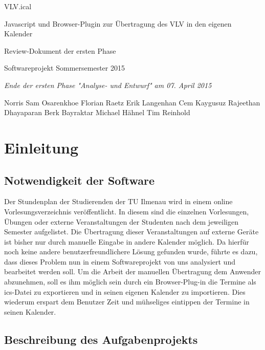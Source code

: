 \documentclass[11pt]{report}
\begin{document}
\begin{center}
\Huge
VLV.ical

\medskip
\large
Javascript und Browser-Plugin zur \"Ubertragung des VLV in den eigenen Kalender

\vskip 1in
\Large
Review-Dokument der ersten Phase

\large
\vskip 1in
Softwareprojekt Sommersemester 2015

\medskip
\textit{
Ende der ersten Phase "Analyse- und Entwurf" am 07. April 2015
}
\vskip 2in

\normalsize
\textup{ 
Norris Sam Osarenkhoe \qquad
Florian Raetz \qquad
}
\textup{ 
Erik Langenhan \qquad
Cem Kaygusuz \qquad
}
\textup{ 
Rajeethan Dhayaparan \qquad
Berk Bayraktar \qquad
}
\textup{ 
Michael H\"ahnel \qquad
Tim Reinhold
}
\end{center}

\newpage
\tableofcontents

\newpage
\chapter{Einleitung}
\section{Notwendigkeit der Software}

\normalsize \normalfont \textnormal
Der Stundenplan der Studierenden der TU Ilmenau wird in einem online Vorlesungsverzeichnis veröffentlicht. In diesem sind die einzelnen Vorlesungen, Übungen oder externe Veranstaltungen der Studenten nach dem jeweiligen Semester aufgelistet. Die Übertragung dieser Veranstaltungen auf externe Geräte ist bisher nur durch manuelle Eingabe in andere Kalender möglich. Da hierfür noch keine andere benutzerfreundlichere Lösung gefunden wurde, führte es dazu, dass dieses Problem nun in einem Softwareprojekt von uns analysiert und bearbeitet werden soll.  
Um die Arbeit der manuellen Übertragung dem Anwender abzunehmen, soll es ihm möglich sein durch ein Browser-Plug-in die Termine als ics-Datei zu exportieren und in seinen eigenen Kalender zu importieren. Dies wiederum erspart dem Benutzer Zeit und mühseliges eintippen der Termine in seinen Kalender.

\section{Beschreibung des Aufgabenprojekts}
\end{document}
